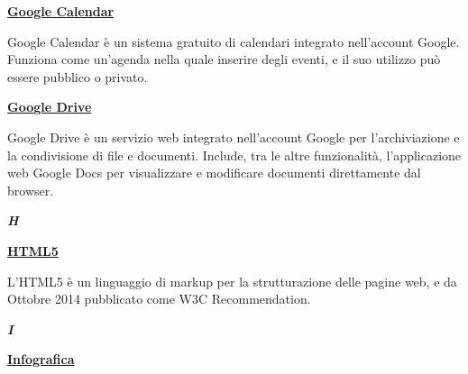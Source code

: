 \bigskip
\begin{addmargin}[0em]{0em}
	\textbf{\underline{Google Calendar}}
\end{addmargin}

\medskip
\begin{addmargin}[5em]{1em}	
Google Calendar è un sistema gratuito di calendari integrato nell'account Google.
Funziona come un'agenda nella quale inserire degli eventi, e il suo utilizzo può essere pubblico o privato.
\end{addmargin}

\bigskip
\begin{addmargin}[0em]{0em}
	\textbf{\underline{Google Drive}}
\end{addmargin}

\medskip
\begin{addmargin}[5em]{1em}	
Google Drive è un servizio web integrato nell'account Google per l'archiviazione e la condivisione di file e documenti.
Include, tra le altre funzionalità,  l'applicazione web Google Docs per visualizzare e modificare documenti direttamente 
dal browser.	
\end{addmargin}	

\newpage

\cleardoublepage
{}
{}
\noindent\hrulefill\hspace{4mm}\textbf{\textsl{\Huge{H}}}\hspace{4mm}\hrulefill

\vspace*{2\bigskipamount}

\begin{addmargin}[0em]{0em}	
	\textbf{\underline{HTML5}}
\end{addmargin}

\medskip
\begin{addmargin}[5em]{1em}	
L'HTML5 è un linguaggio di markup per la strutturazione delle pagine web, e da Ottobre 2014 pubblicato come W3C Recommendation.
\end{addmargin}	

\newpage

\cleardoublepage
{}
{}
\noindent\hrulefill\hspace{4mm}\textbf{\textsl{\Huge{I}}}\hspace{4mm}\hrulefill

\vspace*{2\bigskipamount}

\begin{addmargin}[0em]{0em}	
	\textbf{\underline{Infografica}}
\end{addmargin}

